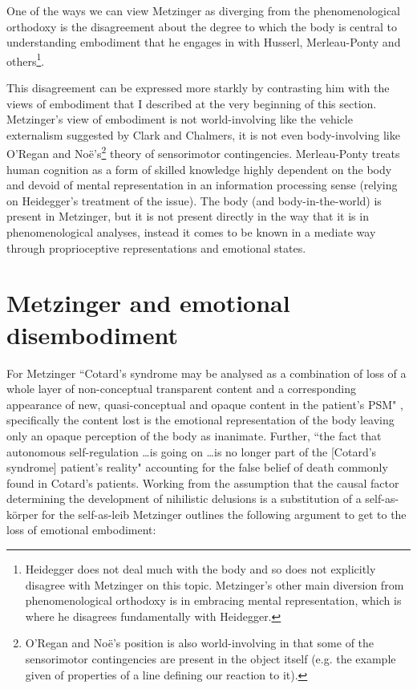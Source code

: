 One of the ways we can view Metzinger as diverging from the phenomenological orthodoxy is the disagreement about the degree to which the body is central to understanding embodiment that he engages in with Husserl, Merleau-Ponty and others\footnote{Heidegger does not deal much with the body and so does not explicitly disagree with Metzinger on this topic. Metzinger's other main diversion from phenomenological orthodoxy is in embracing mental representation, which is where he disagrees fundamentally with Heidegger.}.

This disagreement can be expressed more starkly by contrasting him with the views of embodiment that I described at the very beginning of this section. Metzinger's view of embodiment is not world-involving like the vehicle externalism suggested by Clark and Chalmers, it is not even body-involving like O'Regan and No\"{e}'s\footnote{O'Regan and No\"{e}'s position is also world-involving in that some of the sensorimotor contingencies are present in the object itself (e.g. the example given of properties of a line defining our reaction to it).} theory of sensorimotor contingencies. Merleau-Ponty treats human cognition as a form of skilled knowledge highly dependent on the body and devoid of mental representation in an information processing sense (relying on Heidegger's treatment of the issue). The body (and body-in-the-world) is present in Metzinger, but it is not present directly in the way that it is in phenomenological analyses, instead it comes to be known in a mediate way through proprioceptive representations and emotional states.

\section{Metzinger and emotional disembodiment}
\label{metzinger_emotional_disembodiment}

For Metzinger ``Cotard's syndrome may be analysed as a combination of loss of a whole layer of non-conceptual transparent content and a corresponding appearance of new, quasi-conceptual and opaque content in the patient's PSM" \cite[p. 458]{metzinger2003}, specifically the content lost is the emotional representation of the body leaving only an opaque perception of the body as inanimate. Further, ``the fact that autonomous self-regulation \ldots is going on  \ldots is no longer part of the [Cotard's syndrome] patient's reality" \cite[p. 459]{metzinger2003} accounting for the false belief of death commonly found in Cotard's patients. Working from the assumption that the causal factor determining the development of nihilistic delusions is a substitution of a self-as-k\"{o}rper for the self-as-leib Metzinger outlines the following argument to get to the loss of emotional embodiment:

